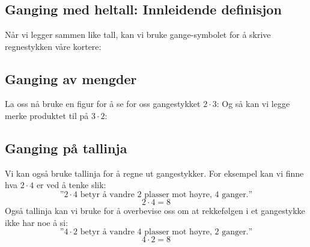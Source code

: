 



	
\section{\gong \label{Gonging} }

\subsection*{Ganging med heltall: Innleidende definisjon }
Når vi legger sammen like tall, kan vi bruke gange-symbolet \sym{$ \cdot $}\;for å skrive regnestykken våre kortere: \regv
{} \regv
{}
\subsection*{Ganging av mengder}
La oss nå bruke en figur for å se for oss gangestykket $ 2\cdot3 $:
Og så kan vi legge merke produktet til på $ 3\cdot 2 $:
\reg[\gangkom \label{gangkom}]{
Produktet er det samme uansett rekkefølge på faktorene.
}

\subsection*{Ganging på tallinja}
Vi kan også bruke tallinja for å regne ut gangestykker. For eksempel kan vi finne hva $ 2\cdot4 $ er ved å tenke slik:
\[\text{''} 2\cdot 4 \text{ betyr å vandre 2 plasser mot høyre, 4 ganger.}\text{''} \]
\[ 2\cdot4=8 \]
Også tallinja kan vi bruke for å overbevise oss om at rekkefølgen i et gangestykke ikke har noe å si:
\[\text{''} 4\cdot 2 \text{ betyr å vandre 4 plasser mot høyre, 2 ganger.}\text{''} \]
\[ 4\cdot2=8 \]


